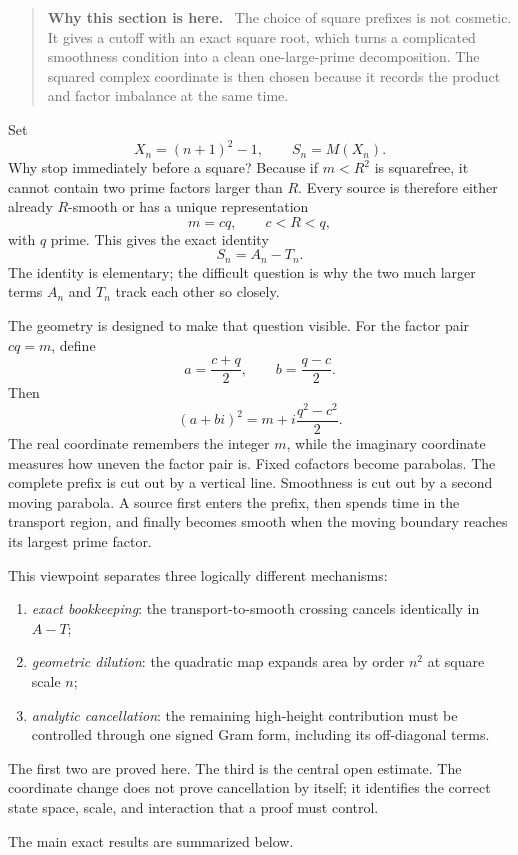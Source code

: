 \documentclass[11pt]{article}
\theoremstyle{definition}
\theoremstyle{remark}
\newcommand{\1}{\mathbf{1}}
\newenvironment{motivation}
  {\begin{quote}\small\color{ovvogray}\textbf{Why this section is here.}\ }
  {\end{quote}}
\begin{document}
\begin{motivation}
The choice of square prefixes is not cosmetic.  It gives a cutoff with an exact square root, which turns a complicated smoothness condition into a clean one-large-prime decomposition.  The squared complex coordinate is then chosen because it records the product and factor imbalance at the same time.
\end{motivation}

Set
\[
 X_n=(n+1)^2-1,\qquad S_n=M(X_n).
\]
Why stop immediately before a square?  Because if $m<R^2$ is squarefree, it cannot contain two prime factors larger than $R$.  Every source is therefore either already $R$-smooth or has a unique representation
\[
 m=cq,\qquad c<R<q,
\]
with $q$ prime.  This gives the exact identity
\[
 S_n=A_n-T_n.
\]
The identity is elementary; the difficult question is why the two much larger terms $A_n$ and $T_n$ track each other so closely.

The geometry is designed to make that question visible.  For the factor pair $cq=m$, define
\[
 a=\frac{c+q}{2},\qquad b=\frac{q-c}{2}.
\]
Then
\[
 (a+bi)^2=m+i\frac{q^2-c^2}{2}.
\]
The real coordinate remembers the integer $m$, while the imaginary coordinate measures how uneven the factor pair is.  Fixed cofactors become parabolas.  The complete prefix is cut out by a vertical line.  Smoothness is cut out by a second moving parabola.  A source first enters the prefix, then spends time in the transport region, and finally becomes smooth when the moving boundary reaches its largest prime factor.

This viewpoint separates three logically different mechanisms:
\begin{enumerate}[leftmargin=1.7em,itemsep=0.35em]
\item \emph{exact bookkeeping}: the transport-to-smooth crossing cancels identically in $A-T$;
\item \emph{geometric dilution}: the quadratic map expands area by order $n^2$ at square scale $n$;
\item \emph{analytic cancellation}: the remaining high-height contribution must be controlled through one signed Gram form, including its off-diagonal terms.
\end{enumerate}
The first two are proved here.  The third is the central open estimate.  The coordinate change does not prove cancellation by itself; it identifies the correct state space, scale, and interaction that a proof must control.

The main exact results are summarized below.
\end{document}
